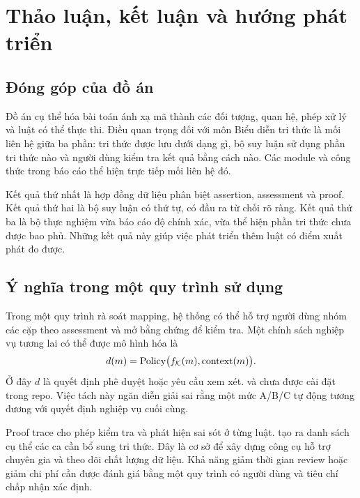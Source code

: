 \chapter{Thảo luận, kết luận và hướng phát triển}

\section{Đóng góp của đồ án}
Đồ án cụ thể hóa bài toán ánh xạ mã thành các đối tượng, quan hệ, phép
xử lý và luật có thể thực thi. Điều quan trọng đối với môn Biểu diễn tri
thức là mối liên hệ giữa ba phần: tri thức được lưu dưới dạng gì, bộ suy
luận sử dụng phần tri thức nào và người dùng kiểm tra kết quả bằng cách nào.
Các module và công thức trong báo cáo thể hiện trực tiếp mối liên hệ đó.

Kết quả thứ nhất là hợp đồng dữ liệu phân biệt assertion, assessment và
proof. Kết quả thứ hai là bộ suy luận có thứ tự, có đầu ra từ chối rõ ràng.
Kết quả thứ ba là bộ thực nghiệm vừa báo cáo độ chính xác, vừa thể hiện
phần tri thức chưa được bao phủ. Những kết quả này giúp việc phát triển
thêm luật có điểm xuất phát đo được.

\section{Ý nghĩa trong một quy trình sử dụng}
Trong một quy trình rà soát mapping, hệ thống có thể hỗ trợ người dùng
nhóm các cặp theo assessment và mở bằng chứng để kiểm tra.
Một chính sách nghiệp vụ tương lai có thể được mô hình hóa là
\begin{equation}
 d(m)=\operatorname{Policy}\bigl(f_{\mathcal{K}}(m),\operatorname{context}(m)\bigr).
\end{equation}
Ở đây $d$ là quyết định phê duyệt hoặc yêu cầu xem xét.
 và  chưa được cài đặt trong repo.
Việc tách này ngăn diễn giải sai rằng một mức A/B/C tự động tương đương
với quyết định nghiệp vụ cuối cùng.

Proof trace cho phép kiểm tra và phát hiện sai sót ở từng luật.
\Unassessed{} tạo ra danh sách cụ thể các ca cần bổ sung tri thức.
Đây là cơ sở để xây dựng công cụ hỗ trợ chuyên gia và theo dõi chất lượng
dữ liệu. Khả năng giảm thời gian review hoặc giảm chi phí cần được đánh
giá bằng một quy trình có người dùng và tiêu chí chấp nhận xác định.

